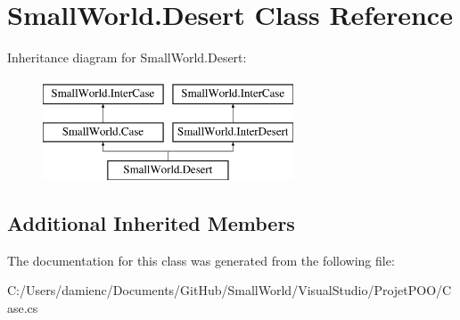 \hypertarget{class_small_world_1_1_desert}{\section{Small\-World.\-Desert Class Reference}
\label{class_small_world_1_1_desert}
}
Inheritance diagram for Small\-World.\-Desert\-:\begin{figure}[H]
\begin{center}
\leavevmode
\includegraphics[height=3.000000cm]{class_small_world_1_1_desert}
\end{center}
\end{figure}
\subsection*{Additional Inherited Members}


The documentation for this class was generated from the following file\-:\begin{DoxyCompactItemize}
\item 
C\-:/\-Users/damienc/\-Documents/\-Git\-Hub/\-Small\-World/\-Visual\-Studio/\-Projet\-P\-O\-O/Case.\-cs\end{DoxyCompactItemize}
